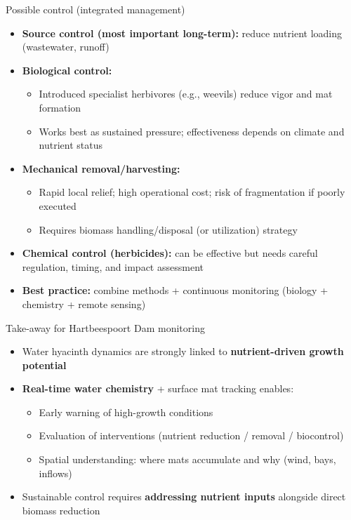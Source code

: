 \begin{frame}{Possible control (integrated management)}
\small
\begin{itemize}
  \item \textbf{Source control (most important long-term):} reduce nutrient loading (wastewater, runoff)
  \item \textbf{Biological control:}
    \begin{itemize}
      \item Introduced specialist herbivores (e.g., weevils) reduce vigor and mat formation
      \item Works best as sustained pressure; effectiveness depends on climate and nutrient status
    \end{itemize}
  \item \textbf{Mechanical removal/harvesting:}
    \begin{itemize}
      \item Rapid local relief; high operational cost; risk of fragmentation if poorly executed
      \item Requires biomass handling/disposal (or utilization) strategy
    \end{itemize}
  \item \textbf{Chemical control (herbicides):} can be effective but needs careful regulation, timing, and impact assessment
  \item \textbf{Best practice:} combine methods + continuous monitoring (biology + chemistry + remote sensing)
\end{itemize}
\end{frame}

\begin{frame}{Take-away for Hartbeespoort Dam monitoring}
\small
\begin{itemize}
  \item Water hyacinth dynamics are strongly linked to \textbf{nutrient-driven growth potential}
  \item \textbf{Real-time water chemistry} + surface mat tracking enables:
    \begin{itemize}
      \item Early warning of high-growth conditions
      \item Evaluation of interventions (nutrient reduction / removal / biocontrol)
      \item Spatial understanding: where mats accumulate and why (wind, bays, inflows)
    \end{itemize}
  \item Sustainable control requires \textbf{addressing nutrient inputs} alongside direct biomass reduction
\end{itemize}
\end{frame}
